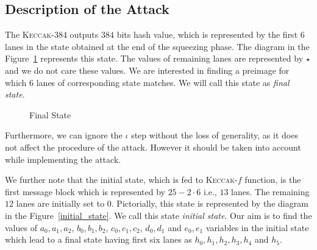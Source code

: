 \documentclass[runningheads]{llncs}
\newcommand{\Keccak}{\mbox{\textsc{Keccak}}}
\begin{document}
\subsection{Description of the Attack}
The \Keccak-{384} outputs $384$ bits hash value, which is represented by the first $6$ lanes in the state obtained at the end of the squeezing phase. The diagram in the Figure~\ref{initial_sq} represents this state. The values of remaining lanes are represented by $\star$ and we do not care these values. We are interested in finding a preimage for which $6$ lanes of corresponding state matches. We will call this state as \emph{final state}.
\begin{figure}[ht]
\begin{center}
\end{center}
\caption{Final State\label{initial_sq}}
\end{figure}
Furthermore, we can ignore the {$\iota$} step without the loss of generality, as it does not affect the procedure of the attack. However it should be taken into account while implementing the attack.

We further note that the initial state, which is fed to \Keccak-$f$ function, is the first message block which is represented by $25-2\cdot 6$ i.e., $13$ lanes. The remaining $12$ lanes are initially set to $0$. Pictorially, this state is represented by the diagram in the Figure~\ref{initial_state}. We call this state \emph{initial state}.
Our aim is to find the values of $a_0, a_1, a_2$, $b_0, b_1, b_2$, $c_0, c_1, c_2$, $d_0, d_1$ and $e_0, e_1$ variables in the initial state which lead to a final state having first six lanes as $h_0, h_1, h_2,h_3, h_4$ and $h_5$. 
\end{document}
